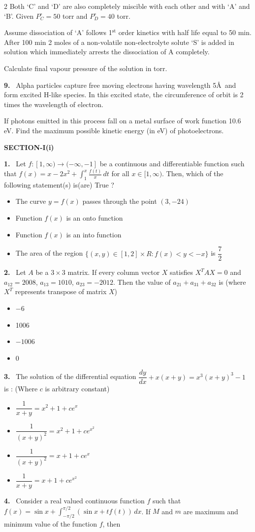 \documentclass[10pt]{extarticle}
\newcommand{\partsec}[2]{\par\medskip\noindent{\large\bfseries PART-#1: #2}\par\smallskip}
\newcommand{\sect}[1]{\par\smallskip\noindent\textbf{#1}\par}
\newcommand{\qn}[1]{\par\smallskip\noindent\textbf{#1.}~}
\newcommand{\paraq}[2]{\par\smallskip\noindent\textbf{Paragraph for Questions #1 and #2}\par}
\newenvironment{qoptions}{\begin{itemize}[leftmargin=1.8em,itemsep=1pt,topsep=2pt,label={}]}{\end{itemize}}
\newcommand{\opt}[2]{\item[(#1)] #2}
\let\oldsect\sect\let\oldparaq\paraq
\renewcommand{\sect}[1]{\Needspace{7\baselineskip}\oldsect{#1}\nopagebreak[4]}
\renewcommand{\paraq}[2]{\Needspace{6\baselineskip}\oldparaq{#1}{#2}\nopagebreak[4]}
\begin{document}
\begin{multicols}{2}
Both `C' and `D' are also completely miscible with each other and with `A' and `B'. Given $P_C^\circ=50$ torr and $P_D^\circ=40$ torr.\par
Assume dissociation of `A' follows 1$^{\text{st}}$ order kinetics with half life equal to 50 min. After 100 min 2 moles of a non-volatile non-electrolyte solute `S' is added in solution which immediately arrests the dissociation of A completely.\par
Calculate final vapour pressure of the solution in torr.
\qn{9} Alpha particles capture free moving electrons having wavelength 5\AA\ and form excited H-like species. In this excited state, the circumference of orbit is 2 times the wavelength of electron.\par
If photons emitted in this process fall on a metal surface of work function 10.6 eV. Find the maximum possible kinetic energy (in eV) of photoelectrons.
\partsec{3}{MATHEMATICS}
\sect{SECTION-I(i)}
\qn{1} Let $f:[1,\infty)\to(-\infty,-1]$ be a continuous and differentiable function such that $f(x)=x-2x^2+\displaystyle\int_1^x\frac{f(t)}{x}\,dt$ for all $x\in[1,\infty)$. Then, which of the following statement(s) is(are) True ?
\begin{qoptions}
\opt{A}{The curve $y=f(x)$ passes through the point $(3,-24)$}
\opt{B}{Function $f(x)$ is an onto function}
\opt{C}{Function $f(x)$ is an into function}
\opt{D}{The area of the region $\{(x,y)\in[1,2]\times R:f(x)<y<-x\}$ is $\dfrac72$}
\end{qoptions}
\qn{2} Let $A$ be a $3\times3$ matrix. If every column vector $X$ satisfies $X^TAX=0$ and $a_{12}=2008$, $a_{13}=1010$, $a_{23}=-2012$. Then the value of $a_{21}+a_{31}+a_{32}$ is (where $X^T$ represents transpose of matrix $X$)
\begin{qoptions}
\opt{A}{$-6$}
\opt{B}{1006}
\opt{C}{$-1006$}
\opt{D}{0}
\end{qoptions}
\qn{3} The solution of the differential equation $\dfrac{dy}{dx}+x(x+y)=x^3(x+y)^3-1$ is : (Where $c$ is arbitrary constant)
\begin{qoptions}
\opt{A}{$\dfrac{1}{x+y}=x^2+1+ce^x$}
\opt{B}{$\dfrac{1}{(x+y)^2}=x^2+1+ce^{x^2}$}
\opt{C}{$\dfrac{1}{(x+y)^2}=x+1+ce^x$}
\opt{D}{$\dfrac{1}{x+y}=x+1+ce^{x^2}$}
\end{qoptions}
\qn{4} Consider a real valued continuous function $f$ such that $f(x)=\sin x+\displaystyle\int_{-\pi/2}^{\pi/2}(\sin x+tf(t))\,dx$. If $M$ and $m$ are maximum and minimum value of the function $f$, then
\begin{qoptions}

\end{qoptions}
\end{multicols}
\end{document}

